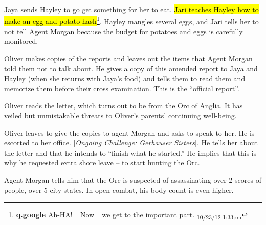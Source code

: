 Jaya sends Hayley to go get something for her to eat.  \hl{Jari teaches Hayley how to make an egg-and-potato hash}\footnote{\textbf{q.google }Ah-HA!  \_Now\_ we get to the important part. \textsubscript{10/23/12 1:33pm}}.  Hayley mangles several eggs, and Jari tells her to not tell Agent Morgan because the budget for potatoes and eggs is carefully monitored.  



Oliver makes copies of the reports and leaves out the items that Agent Morgan told them not to talk about.  He gives a copy of this amended report to Jaya and Hayley (when she returns with Jaya's food) and tells them to read them and memorize them before their cross examination.  This is the ``official report''.



Oliver reads the letter, which turns out to be from the Orc of Anglia.  It has veiled but unmistakable threats to Oliver's parents' continuing well-being.



Oliver leaves to give the copies to agent Morgan and asks to speak to her.  He is escorted to her office.  {[}\textit{Ongoing Challenge: Gerhauser Sisters}{]}.  He tells her about the letter and that he intends to ``finish what he started.''  He implies that this is why he requested extra shore leave -- to start hunting the Orc.



Agent Morgan tells him that the Orc is suspected of assassinating over 2 scores of people, over 5 city-states.  In open combat, his body count is even higher.



